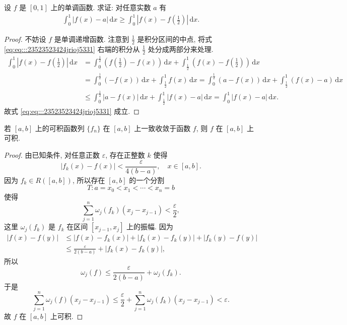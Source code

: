 \documentclass[../../main.tex]{subfiles}%
\begin{document}
\begin{proposition}\label{proposition:单调函数减任意常数积分小于减其中点的积分}
设 $f$ 是 $[0,1]$ 上的单调函数. 求证: 对任意实数 $a$ 有
\begin{align}\label{eq:eq:::23523523424jrioj5331}
\int_{0}^{1}|f(x)-a|\,\mathrm{d}x\geqslant\int_{0}^{1}\left|f(x)-f\left(\frac{1}{2}\right)\right|\,\mathrm{d}x.
\end{align}
\end{proposition}
\begin{proof}
不妨设 $f$ 是单调递增函数. 注意到 $\frac{1}{2}$ 是积分区间的中点, 将式 \eqref{eq:eq:::23523523424jrioj5331} 右端的积分从 $\frac{1}{2}$ 处分成两部分来处理.
\begin{align*}
\int_{0}^{1}\left|f(x)-f\left(\frac{1}{2}\right)\right|\,\mathrm{d}x&=\int_{0}^{\frac{1}{2}}\left(f\left(\frac{1}{2}\right)-f(x)\right)\,\mathrm{d}x+\int_{\frac{1}{2}}^{1}\left(f(x)-f\left(\frac{1}{2}\right)\right)\,\mathrm{d}x\\
&=\int_{0}^{\frac{1}{2}}(-f(x))\,\mathrm{d}x+\int_{\frac{1}{2}}^{1}f(x)\,\mathrm{d}x
=\int_{0}^{\frac{1}{2}}(a-f(x))\,\mathrm{d}x+\int_{\frac{1}{2}}^{1}(f(x)-a)\,\mathrm{d}x\\
&\leqslant\int_{0}^{\frac{1}{2}}|a-f(x)|\,\mathrm{d}x+\int_{\frac{1}{2}}^{1}|f(x)-a|\,\mathrm{d}x
=\int_{0}^{1}|f(x)-a|\,\mathrm{d}x.
\end{align*}
故式 \eqref{eq:eq:::23523523424jrioj5331} 成立.
\end{proof}

\begin{example}
若 $[a,b]$ 上的可积函数列 $\{f_n\}$ 在 $[a,b]$ 上一致收敛于函数 $f$, 则 $f$ 在 $[a,b]$ 上可积.
\end{example}
\begin{proof}
由已知条件, 对任意正数 $\varepsilon$, 存在正整数 $k$ 使得
$$|f_k(x)-f(x)|<\frac{\varepsilon}{4(b-a)}, \quad x \in[a,b].$$
因为 $f_k \in R([a,b])$, 所以存在 $[a,b]$ 的一个分割
$$T: a=x_0<x_1<\cdots<x_n=b$$
使得
$$\sum_{j=1}^n \omega_j(f_k)(x_j-x_{j-1})<\frac{\varepsilon}{2},$$
这里 $\omega_j(f_k)$ 是 $f_k$ 在区间 $[x_{j-1},x_j]$ 上的振幅. 因为
$$
\begin{aligned}
|f(x)-f(y)| & \leqslant |f(x)-f_k(x)|+\left|f_k(x)-f_k(y)\right|+\left|f_k(y)-f(y)\right| \\
& \leqslant  \frac{\varepsilon}{2(b-a)}+\left|f_k(x)-f_k(y)\right|,
\end{aligned}
$$
所以
$$\omega_j(f) \leqslant  \frac{\varepsilon}{2(b-a)}+\omega_j(f_k).$$
于是
$$\sum_{j=1}^n \omega_j(f)\left(x_j-x_{j-1}\right) \leqslant  \frac{\varepsilon}{2}+\sum_{j=1}^n \omega_j\left(f_k\right)\left(x_j-x_{j-1}\right)<\varepsilon.$$
故 $f$ 在 $[a,b]$ 上可积.
\end{proof}
\end{document}
